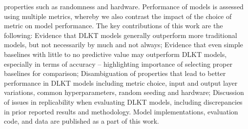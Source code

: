 \documentclass[letterpaper,11pt,oneside]{book} %
\begin{document}
properties such as randomness and hardware. Performance of models is
assessed using multiple metrics, whereby we also contrast the impact
of the choice of metric on model performance. The key contributions of
this work are the following: Evidence that DLKT models generally
outperform more traditional models, but not necessarily by much and not
always; Evidence that even simple baselines with little to no predictive
value may outperform DLKT models, especially in terms of accuracy --
highlighting importance of selecting proper baselines for comparison;
Disambiguation of properties that lead to better performance in DLKT
models including metric choice, input and output layer variations,
common hyperparameters, random seeding and hardware; Discussion of
issues in replicability when evaluating DLKT models, including
discrepancies in prior reported results and methodology. Model
implementations, evaluation code, and data are published as a part of
this work.

\clearpage
\end{document}

